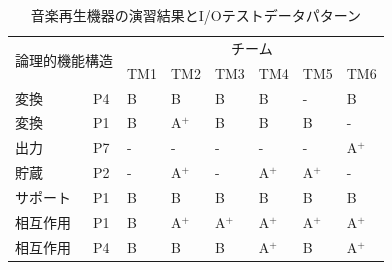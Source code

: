\begin{table}[htbp]
  \centering
\caption{音楽再生機器の演習結果とI/Oテストデータパターン}
    \begin{tabular}{|l|l|l|l|l|l|l|l|}
    \hline
    \multicolumn{2}{|c|}{\multirow{2}[4]{*}{論理的機能構造}} & \multicolumn{6}{c|}{チーム} \bigstrut\\
\cline{3-8}    \multicolumn{2}{|c|}{} & TM1   & TM2   & TM3   & TM4   & TM5   & TM6 \bigstrut\\
    \hline
    変換 & P4    & B     & B     & B     & B     & -     & B \bigstrut\\
    \hline
    変換 & P1    & B     & A${}^\text{+}$    & B     & B     & B     & - \bigstrut\\
    \hline
    出力 & P7    & -     & -     & -     & -     & -     & A${}^\text{+}$ \bigstrut\\
    \hline
    貯蔵 & P2    & -     & A${}^\text{+}$    & -     & A${}^\text{+}$    & A${}^\text{+}$    & - \bigstrut\\
    \hline
    サポート & P1    & B     & B     & B     & B     & B     & B \bigstrut\\
    \hline
    相互作用 & P1    & B     & A${}^\text{+}$    & A${}^\text{+}$    & A${}^\text{+}$    & A${}^\text{+}$    & A${}^\text{+}$ \bigstrut\\
    \hline
    相互作用 & P4    & B     & B     & B     & A${}^\text{+}$    & B     & A${}^\text{+}$ \bigstrut\\
    \hline
    \end{tabular}%
\label{tab:D-4-tab7}%
\end{table}%

